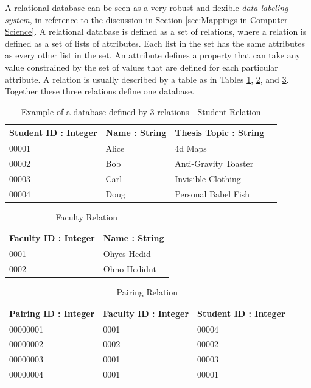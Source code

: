 A relational database can be seen as a very robust and flexible \emph{data labeling system}, in reference to the discussion in Section \ref{sec:Mappings in Computer Science}. A relational database is defined as a set of relations, where a relation is defined as a set of lists of attributes. Each list in the set has the same attributes as every other list in the set. An attribute defines a property that can take any value constrained by the set of values that are defined for each particular attribute. A relation is usually described by a table as in Tables \ref{tab:studentrelation}, \ref{tab:facultyrelation}, and \ref{tab:relation}. Together these three relations define one database.

\begin{table}
    \begin{center}
    \begin{tabular}{ | l | l | l | l | }
    \hline
    Student ID : Integer & Name : String & Thesis Topic : String \\ \hline
    00001 & Alice & 4d Maps \\ \hline
    00002 & Bob &  Anti-Gravity Toaster \\ \hline
    00003 & Carl & Invisible Clothing \\ \hline
    00004 & Doug & Personal Babel Fish \\
    \hline
    \end{tabular}
    \end{center}
    \caption{Example of a database defined by 3 relations - Student Relation}
    \label{tab:studentrelation}
\end{table}

\begin{table}
    \begin{center}
    \begin{tabular}{ | l | l | }
    \hline
    Faculty ID : Integer & Name : String \\ \hline
    0001 & Ohyes Hedid \\ \hline
    0002 & Ohno Hedidnt \\
    \hline
    \end{tabular}
    \end{center}
    \caption{Faculty Relation}
    \label{tab:facultyrelation}
\end{table}

\begin{table}
    \begin{center}
    \begin{tabular}{ | l | l | l | }
    \hline
    Pairing ID : Integer & Faculty ID : Integer & Student ID : Integer \\ \hline
    00000001 & 0001 & 00004 \\ \hline
    00000002 & 0002 & 00002 \\ \hline
    00000003 & 0001 & 00003 \\ \hline
    00000004 & 0001 & 00001 \\ 
    \hline
    \end{tabular}
    \end{center}
    \caption{Pairing Relation}
    \label{tab:relation}
\end{table}

